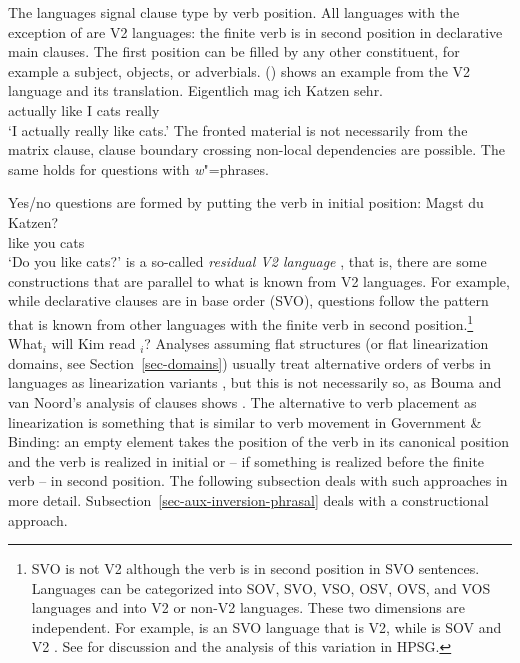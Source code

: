 \documentclass[output=paper,biblatex,babelshorthands,newtxmath,draftmode,colorlinks,citecolor=brown]{langscibook}
\begin{document}
The  languages signal clause type by verb position. All  languages with the
exception of  are V2 languages: the finite verb is in second position in declarative main
clauses. The first position can be filled by any other constituent, for example a subject,
objects, or adverbials. () shows an example from the V2 language  and its  translation.
\ea 
\gll Eigentlich mag ich Katzen sehr.\\
     actually   like I cats really\\
\glt `I actually really like cats.'
\z
The fronted material is not necessarily from the matrix clause, clause boundary
crossing non-local dependencies are possible. The same holds for questions with \emph{w}"=phrases. 

Yes/no questions are formed by putting the verb in initial position:
\ea
\gll Magst du Katzen?\\
     like  you cats\\
\glt `Do you like cats?'
\z
{} is a so-called \emph{residual V2 language} \citep{Rizzi1990a-u}, that is, there are
some constructions that are parallel to what is known from V2 languages.
For example, while declarative clauses are in base order (SVO), questions follow the pattern that is
known from other  languages with the finite verb in second position.\footnote{%
  SVO is not V2 although the verb is in second position in SVO sentences. Languages can be
  categorized into SOV, SVO, VSO, OSV, OVS, and VOS languages and into V2 or non-V2 languages. These two
  dimensions are independent. For example,  is an SVO language that is V2, while  is SOV
  and V2 \citep{Haftka96a,Haider2020a}. See  for discussion and the analysis of this variation in HPSG.
}
\ea
What$_i$ will Kim read \trace$_i$? 
\z
Analyses assuming flat structures (or flat linearization domains, see Section~\ref{sec-domains})
usually treat alternative orders of verbs in  languages as linearization variants
\citep{Reape94a,Kathol2001a,Mueller95c,Mueller2003a,TBjerre2006a}, but this is not necessarily so, as
Bouma and van Noord's analysis of  clauses shows \citep[, 71]{BvN98a}. The alternative to
verb placement as linearization is something that is similar to verb movement in Government \&
Binding\indexgb: an empty element takes the position of the verb in its canonical position and the verb is realized
in initial or -- if something is realized before the finite verb -- in second position. The following subsection deals with such approaches in more
detail. Subsection~\ref{sec-aux-inversion-phrasal} deals with a constructional approach.
\end{document}
